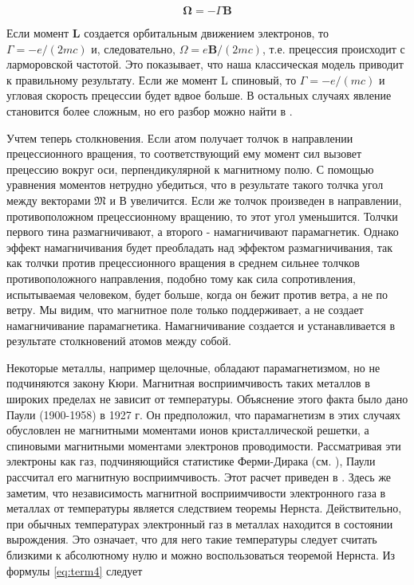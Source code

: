 \documentclass[12pt]{article}
\begin{document}
  \begin{equation}
    \boldsymbol{\Omega} = -\Gamma\mathbf{B}
  \end{equation}

  Если момент $\mathbf{L}$ создается орбитальным движением электронов, то $\Gamma=-e /(2 m c)$ и, следовательно, $\Omega=e \mathbf{B} /(2 m c)$, т.е. прецессия происходит с ларморовской частотой. Это показывает, что наша классическая модель приводит к правильному результату. Если же момент L спиновый, то $\Gamma=-e /(m c)$ и угловая скорость прецессии будет вдвое больше. В остальных случаях явление становится более сложным, но его разбор можно найти в \cite{sivykhin5}.

  Учтем теперь столкновения. Если атом получает толчок в направлении прецессионного вращения, то соответствующий ему момент сил вызовет прецессию вокруг оси, перпендикулярной к магнитному полю. С помощью уравнения моментов нетрудно убедиться, что в результате такого толчка угол между векторами $\mathfrak{M}$ и В увеличится. Если же толчок произведен в направлении, противоположном прецессионному вращению, то этот угол уменьшится. Толчки первого тина размагничивают, а второго - намагничивают парамагнетик. Однако эффект намагничивания будет преобладать над эффектом размагничивания, так как толчки против прецессионного вращения в среднем сильнее толчков противоположного направления, подобно тому как сила сопротивления, испытываемая человеком, будет больше, когда он бежит против ветра, а не по ветру. Мы видим, что магнитное поле только поддерживает, а не создает намагничивание парамагнетика. Намагничивание создается и устанавливается в результате столкновений атомов между собой.

  Некоторые металлы, например щелочные, обладают парамагнетизмом, но не подчиняются закону Кюри. Магнитная восприимчивость таких металлов в широких пределах не зависит от температуры. Объяснение этого факта было дано Паули (1900-1958) в 1927 г. Он предположил, что парамагнетизм в этих случаях обусловлен не магнитными моментами ионов кристаллической решетки, а спиновыми магнитными моментами электронов проводимости. Рассматривая эти электроны как газ, подчиняющийся статистике Ферми-Дирака (см. \cite{sivykhin2}), Паули рассчитал его магнитную восприимчивость. Этот расчет приведен в \cite[\S99]{sivykhin3}. Здесь же заметим, что независимость магнитной восприимчивости электронного газа в металлах от температуры является следствием теоремы Нернста. Действительно, при обычных температурах электронный газ в металлах находится в состоянии вырождения. Это означает, что для него такие температуры следует считать близкими к абсолютному нулю и можно воспользоваться теоремой Нернста. Из формулы \ref{eq:term4} следует
\end{document}
